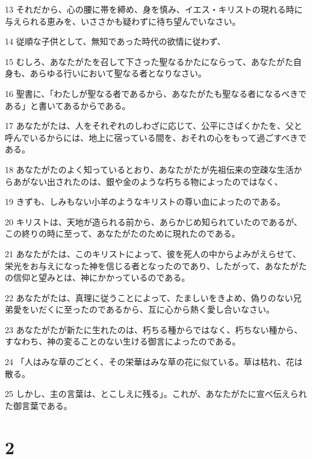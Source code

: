\par 13 それだから、心の腰に帯を締め、身を慎み、イエス・キリストの現れる時に与えられる恵みを、いささかも疑わずに待ち望んでいなさい。
\par 14 従順な子供として、無知であった時代の欲情に従わず、
\par 15 むしろ、あなたがたを召して下さった聖なるかたにならって、あなたがた自身も、あらゆる行いにおいて聖なる者となりなさい。
\par 16 聖書に、「わたしが聖なる者であるから、あなたがたも聖なる者になるべきである」と書いてあるからである。
\par 17 あなたがたは、人をそれぞれのしわざに応じて、公平にさばくかたを、父と呼んでいるからには、地上に宿っている間を、おそれの心をもって過ごすべきである。
\par 18 あなたがたのよく知っているとおり、あなたがたが先祖伝来の空疎な生活からあがない出されたのは、銀や金のような朽ちる物によったのではなく、
\par 19 きずも、しみもない小羊のようなキリストの尊い血によったのである。
\par 20 キリストは、天地が造られる前から、あらかじめ知られていたのであるが、この終りの時に至って、あなたがたのために現れたのである。
\par 21 あなたがたは、このキリストによって、彼を死人の中からよみがえらせて、栄光をお与えになった神を信じる者となったのであり、したがって、あなたがたの信仰と望みとは、神にかかっているのである。
\par 22 あなたがたは、真理に従うことによって、たましいをきよめ、偽りのない兄弟愛をいだくに至ったのであるから、互に心から熱く愛し合いなさい。
\par 23 あなたがたが新たに生れたのは、朽ちる種からではなく、朽ちない種から、すなわち、神の変ることのない生ける御言によったのである。
\par 24 「人はみな草のごとく、その栄華はみな草の花に似ている。草は枯れ、花は散る。
\par 25 しかし、主の言葉は、とこしえに残る」。これが、あなたがたに宣べ伝えられた御言葉である。

\chapter{2}

